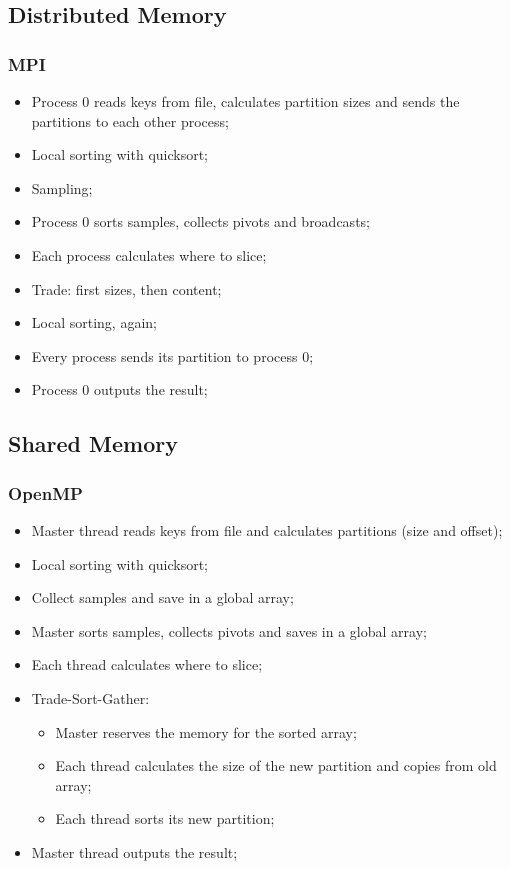 \documentclass{beamer}
\begin{document}
\subsection{Distributed Memory}
\begin{frame}
	\frametitle{MPI}
	\begin{itemize}
		\item{Process 0 reads keys from file, calculates partition sizes and sends the partitions to each other process;}
		\pause
		\item{Local sorting with quicksort;}
		\pause
		\item{Sampling;}
		\pause
		\item{Process 0 sorts samples, collects pivots and broadcasts;}
		\pause
		\item{Each process calculates where to slice;}
		\pause
		\item{Trade: first sizes, then content;}
		\pause
		\item{Local sorting, again;}
		\pause
		\item{Every process sends its partition to process 0;}
		\pause
		\item{Process 0 outputs the result;}
	\end{itemize}
\end{frame}












\subsection{Shared Memory}
\begin{frame}
	\frametitle{OpenMP}
	\begin{itemize}
		\item{Master thread reads keys from file and calculates partitions (size and offset);}
		\pause
		\item{Local sorting with quicksort;}
		\pause
		\item{Collect samples and save in a global array;}
		\pause
		\item{Master sorts samples, collects pivots and saves in a global array;}
		\pause
		\item{Each thread calculates where to slice;}
		\pause
		\item{Trade-Sort-Gather:
		\begin{itemize}
			\item{Master reserves the memory for the sorted array;}
			\item{Each thread calculates the size of the new partition and copies from old array;}
			\item{Each thread sorts its new partition;}
		\end{itemize}
		}
		\pause
		\item{Master thread outputs the result;}
	\end{itemize}
\end{frame}
\end{document}
